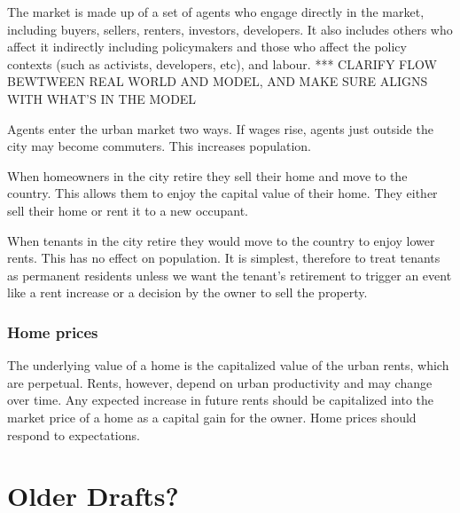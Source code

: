 The market is made up of a set of agents who engage directly in the market, including buyers, sellers, renters, investors, developers. 
It also includes others who affect it indirectly including policymakers and those who affect the policy contexts (such as activists, developers, etc), and labour.
*** CLARIFY FLOW BEWTWEEN REAL WORLD AND MODEL, AND MAKE SURE ALIGNS WITH WHAT'S IN THE MODEL

Agents enter the urban market two ways. If wages rise, agents just outside the city may become commuters. This increases population. 

When homeowners in the city retire they sell their home and move to the country. This allows them  to enjoy the capital value of their home.  They either sell their home or rent it to a new occupant. 

When  tenants in the city retire they would move to the country to enjoy lower rents. This has no effect on population. It is simplest, therefore to treat tenants as permanent residents unless we want the tenant's retirement to trigger an event like a rent increase or a decision by the owner to sell the property.

\subsection{Home prices}
The underlying value of a home is the capitalized value of the urban rents, which are perpetual.  Rents, however, depend on urban productivity and may change over time. Any expected increase in future rents should be capitalized into the market price of a home as a capital gain for the owner. Home prices should respond to expectations.



\chapter{Older Drafts?}



